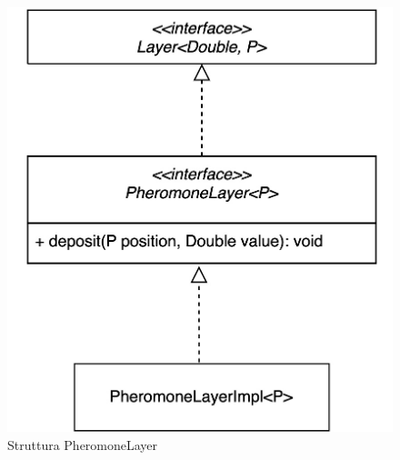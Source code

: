 \begin{figure}[h!]
    \centering
    \includegraphics[width=.8\linewidth]{figures/pheromoneLayer.jpeg}
    \caption{Struttura PheromoneLayer}\label{fig:phLayer}
\end{figure}

\clearpage
